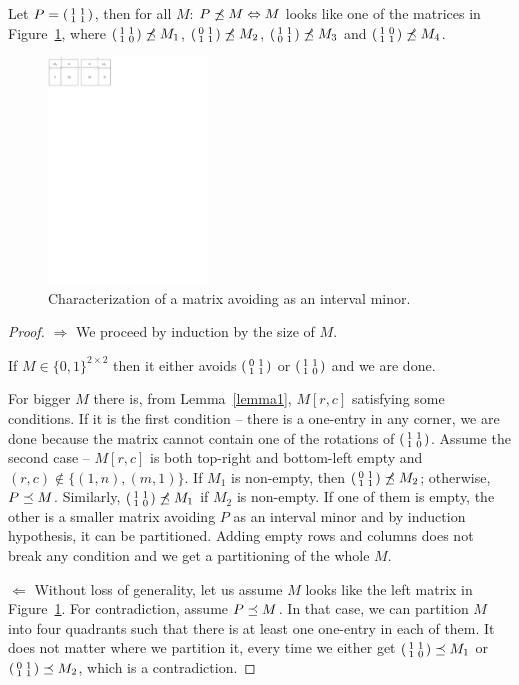 \begin{thm}
Let $P=\left(\begin{smallmatrix}1&1\\1&1\end{smallmatrix}\right)$, then for all $M$: $P\not\preceq M\Leftrightarrow M$ looks like one of the matrices in Figure~\ref{p33}, where $\left(\begin{smallmatrix}1&1\\1&0\end{smallmatrix}\right)\not\preceq M_1$, $\left(\begin{smallmatrix}0&1\\1&1\end{smallmatrix}\right)\not\preceq M_2$, $\left(\begin{smallmatrix}1&1\\0&1\end{smallmatrix}\right)\not\preceq M_3$ and $\left(\begin{smallmatrix}1&0\\1&1\end{smallmatrix}\right)\not\preceq M_4$.
\end{thm}
\begin{figure}[h!]
\centering
\includegraphics[height=60mm]{img/p33.pdf}
\caption{Characterization of a matrix avoiding \usebox{\smlmatb} as an interval minor.}
\label{p33}
\end{figure}
\begin{proof}
\item[$\Rightarrow$] We proceed by induction by the size of $M$.

If $M\in\{0,1\}^{2\times2}$ then it either avoids $\left(\begin{smallmatrix}0&1\\1&1\end{smallmatrix}\right)$ or $\left(\begin{smallmatrix}1&1\\1&0\end{smallmatrix}\right)$ and we are done.

For bigger $M$ there is, from Lemma~\ref{lemma1}, $M[r,c]$ satisfying some conditions. If it is the first condition -- there is a one-entry in any corner, we are done because the matrix cannot contain one of the rotations of $\left(\begin{smallmatrix}1&1\\1&0\end{smallmatrix}\right)$. Assume the second case -- $M[r,c]$ is both top-right and bottom-left empty and $(r,c)\not\in\{(1,n),(m,1)\}$. If $M_1$ is non-empty, then $\left(\begin{smallmatrix}0&1\\1&1\end{smallmatrix}\right)\not\preceq M_2$; otherwise, $P\preceq M$. Similarly, $\left(\begin{smallmatrix}1&1\\1&0\end{smallmatrix}\right)\not\preceq M_1$ if $M_2$ is non-empty. If one of them is empty, the other is a smaller matrix avoiding $P$ as an interval minor and by induction hypothesis, it can be partitioned. Adding empty rows and columns does not break any condition and we get a partitioning of the whole $M$.
\item[$\Leftarrow$] Without loss of generality, let us assume $M$ looks like the left matrix in Figure~\ref{p33}. For contradiction, assume $P\preceq M$. In that case, we can partition $M$ into four quadrants such that there is at least one one-entry in each of them. It does not matter where we partition it, every time we either get $\left(\begin{smallmatrix}1&1\\1&0\end{smallmatrix}\right)\preceq M_1$ or $\left(\begin{smallmatrix}0&1\\1&1\end{smallmatrix}\right)\preceq M_2$, which is a contradiction.
\end{proof}

